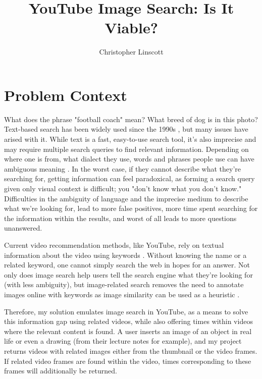 \documentclass[10pt,twocolumn]{article}
\title{YouTube Image Search: Is It Viable?}
\author{Christopher Linscott}
\affiliation{Occidental College}
\begin{document}
\maketitle


\section{Problem Context}

What does the phrase "football coach" mean? What breed of dog is in this photo? Text-based search has been widely used since the 1990s \cite{WikipediaFullText}, but many issues have arised with it. While text is a fast, easy-to-use search tool, it's also imprecise and may require multiple search queries to find relevant information. Depending on where one is from, what dialect they use, words and phrases people use can have ambiguous meaning \cite{Beall2008}. In the worst case, if they cannot describe what they're searching for, getting information can feel paradoxical, as forming a search query given only visual context is difficult; you "don't know what you don't know." Difficulties in the ambiguity of language and the imprecise medium to describe what we're looking for, lead to more false positives, more time spent searching for the information within the results, and worst of all leads to more questions unanswered.

Current video recommendation methods, like YouTube, rely on textual information about the video using keywords \cite{Stanford2021}. Without knowing the name or a related keyword, one cannot simply search the web in hopes for an answer. Not only does image search help users tell the search engine what they’re looking for (with less ambiguity), but image-related search removes the need to annotate images online with keywords as image similarity can be used as a heuristic \cite{Adrakatti2016}.

Therefore, my solution emulates image search in YouTube, as a means to solve this information gap using related videos, while also offering times within videos where the relevant content is found. A user inserts an image of an object in real life or even a drawing (from their lecture notes for example), and my project returns videos with related images either from the thumbnail or the video frames. If related video frames are found within the video, times corresponding to these frames will additionally be returned.
\end{document}
